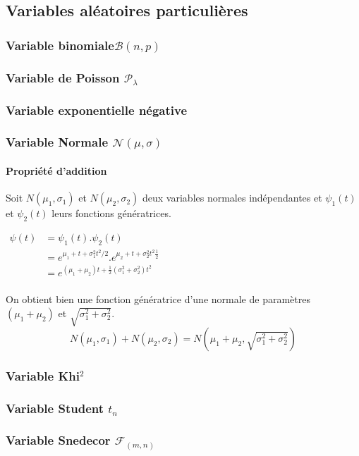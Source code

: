 \newpage
\subsection{Variables aléatoires particulières}


\subsubsection{Variable binomiale$\mathcal{B}(n,p)$}
\subsubsection{Variable de Poisson $\mathcal{P}_\lambda$}
\subsubsection{Variable exponentielle négative}
\subsubsection{Variable Normale $\mathcal{N}(\mu,\sigma)$}



\paragraph{Propriété d'addition}
Soit $N(\mu_1,\sigma_1)$ et $N(\mu_2,\sigma_2)$ deux variables normales indépendantes et $\psi_1(t)$ et $\psi_2(t)$ leurs fonctions génératrices.
\begin{center}
$\begin{array}{LL}
\psi(t) &= \psi_1(t).\psi_2(t)\\
        &= e^{\mu_1+t+\sigma_1^2t^2/2}.e^{\mu_2+t+\sigma_2^2t^2\frac{1}{2}}\\
        &= e^{(\mu_1+\mu_2)t+\frac{1}{2}(\sigma_1^2+\sigma_2^2)t^2}\\
\end{array}$
\end{center}
On obtient bien une fonction génératrice d'une normale de paramètres $(\mu_1+\mu_2)$ et $\sqrt{\sigma_1^2+\sigma_2^2}$.
$$\boxed{N(\mu_1,\sigma_1) + N(\mu_2,\sigma_2) = N\left(\mu_1+\mu_2,\sqrt{\sigma_1^2+\sigma_2^2}\right)}$$







\subsubsection{Variable Khi$^2$}
\subsubsection{Variable Student $t_n$}
\subsubsection{Variable Snedecor $\mathcal{F}_{(m,n)}$}



